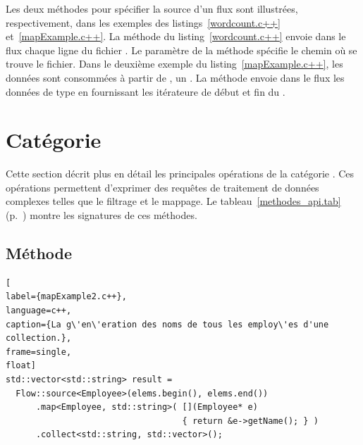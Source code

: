 Les deux m\'ethodes pour sp\'ecifier la source d'un flux sont illustr\'ees, respectivement, dans les exemples des listings~\ref{wordcount.c++} et~\ref{mapExample.c++}. La m\'ethode  du listing~\ref{wordcount.c++} envoie dans le flux chaque ligne du fichier . Le param\`etre  de la m\'ethode sp\'ecifie le chemin o\`u se trouve le fichier. Dans le deuxième exemple du listing~\ref{mapExample.c++}, les donn\'ees sont consomm\'ees \`a partir de , un . La m\'ethode  envoie dans le flux les donn\'ees de type  en fournissant les it\'erateure de d\'ebut et fin du .


\section{Cat\'egorie }

\label{transformation.sect}

Cette section d\'ecrit plus en d\'etail les principales op\'erations de la cat\'egorie . Ces op\'erations permettent d'exprimer des requ\^etes de traitement de donn\'ees complexes telles que le filtrage et le mappage. Le tableau~\ref{methodes_api.tab} (p.~\pageref{transformation.page}) montre les signatures de ces méthodes. 


\subsection{M\'ethode }




\begin{lstlisting}[
label={mapExample2.c++},
language=c++,
caption={La g\'en\'eration des noms de tous les employ\'es d'une collection.},
frame=single,
float]
std::vector<std::string> result =
  Flow::source<Employee>(elems.begin(), elems.end())
      .map<Employee, std::string>( [](Employee* e) 
                                   { return &e->getName(); } )
      .collect<std::string, std::vector>();
\end{lstlisting}


